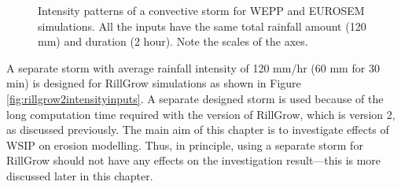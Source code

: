 \begin{figure}[htbp]
  \centering
  \caption[Intensity patterns of a convective storm for WEPP and EUROSEM
simulations.]{Intensity patterns of a convective storm for WEPP and EUROSEM
simulations. All the inputs have the same total rainfall amount (120 mm) and
duration (2 hour). Note the scales of the axes.}
  \label{fig:weppeurosemintensityinputstwohours}
\end{figure}

A separate storm with average rainfall intensity of 120 mm/hr (60 mm for 30
min) is designed for RillGrow simulations as shown in Figure
\ref{fig:rillgrow2intensityinputs}. A separate designed storm is used because
of the long computation time required with the version of RillGrow, which is
version 2, as discussed previously. The main aim of this chapter is to
investigate effects of WSIP on erosion modelling. Thus, in principle, using a
separate storm for RillGrow should not have any effects on the investigation
result---this is more discussed later in this chapter.

